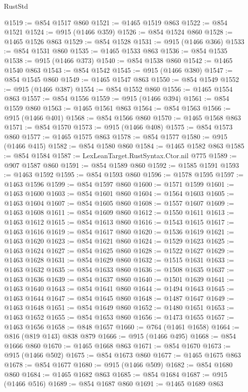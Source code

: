 \begin{lexlean}{RustStd}
\begin{coremodule}
@1519 := @854 @1517 @860
@1521 := @1465 @1519 @863
@1522 := @854 @1521
@1524 := @915 (@1466 @359)
@1526 := @854 @1524 @860
@1528 := @1465 @1526 @863
@1529 := @854 @1528
@1531 := @915 (@1466 @366)
@1533 := @854 @1531 @860
@1535 := @1465 @1533 @863
@1536 := @854 @1535
@1538 := @915 (@1466 @373)
@1540 := @854 @1538 @860
@1542 := @1465 @1540 @863
@1543 := @854 @1542
@1545 := @915 (@1466 @380)
@1547 := @854 @1545 @860
@1549 := @1465 @1547 @863
@1550 := @854 @1549
@1552 := @915 (@1466 @387)
@1554 := @854 @1552 @860
@1556 := @1465 @1554 @863
@1557 := @854 @1556
@1559 := @915 (@1466 @394)
@1561 := @854 @1559 @860
@1563 := @1465 @1561 @863
@1564 := @854 @1563
@1566 := @915 (@1466 @401)
@1568 := @854 @1566 @860
@1570 := @1465 @1568 @863
@1571 := @854 @1570
@1573 := @915 (@1466 @408)
@1575 := @854 @1573 @860
@1577 := @1465 @1575 @863
@1578 := @854 @1577
@1580 := @915 (@1466 @415)
@1582 := @854 @1580 @860
@1584 := @1465 @1582 @863
@1585 := @854 @1584
@1587 := LexLeanTarget.RustSyntax.Ctor.nil @775
@1589 := @907 @1587 @860
@1591 := @854 @1589 @860
@1592 := @1585 @1591
@1593 := @1463 @1592
@1595 := @854 @1593 @860
@1596 := @1578 @1595
@1597 := @1463 @1596
@1599 := @854 @1597 @860
@1600 := @1571 @1599
@1601 := @1463 @1600
@1603 := @854 @1601 @860
@1604 := @1564 @1603
@1605 := @1463 @1604
@1607 := @854 @1605 @860
@1608 := @1557 @1607
@1609 := @1463 @1608
@1611 := @854 @1609 @860
@1612 := @1550 @1611
@1613 := @1463 @1612
@1615 := @854 @1613 @860
@1616 := @1543 @1615
@1617 := @1463 @1616
@1619 := @854 @1617 @860
@1620 := @1536 @1619
@1621 := @1463 @1620
@1623 := @854 @1621 @860
@1624 := @1529 @1623
@1625 := @1463 @1624
@1627 := @854 @1625 @860
@1628 := @1522 @1627
@1629 := @1463 @1628
@1631 := @854 @1629 @860
@1632 := @1515 @1631
@1633 := @1463 @1632
@1635 := @854 @1633 @860
@1636 := @1508 @1635
@1637 := @1463 @1636
@1639 := @854 @1637 @860
@1640 := @1501 @1639
@1641 := @1463 @1640
@1643 := @854 @1641 @860
@1644 := @1494 @1643
@1645 := @1463 @1644
@1647 := @854 @1645 @860
@1648 := @1487 @1647
@1649 := @1463 @1648
@1651 := @854 @1649 @860
@1652 := @1480 @1651
@1653 := @1463 @1652
@1655 := @854 @1653 @860
@1656 := @1473 @1655
@1657 := @1463 @1656
@1658 := @848 @1657
@1660 := @764 (@1461 @1658)
@1664 := @816 (@819 @143) @838 @879
@1666 := @915 (@1466 @495)
@1668 := @854 @1666 @860
@1670 := @1465 @1668 @863
@1671 := @854 @1670
@1673 := @915 (@1466 @502)
@1675 := @854 @1673 @860
@1677 := @1465 @1675 @863
@1678 := @854 @1677
@1680 := @915 (@1466 @509)
@1682 := @854 @1680 @860
@1684 := @1465 @1682 @863
@1685 := @854 @1684
@1687 := @915 (@1466 @516)
@1689 := @854 @1687 @860
@1691 := @1465 @1689 @863

\end{coremodule}
\end{lexlean}
